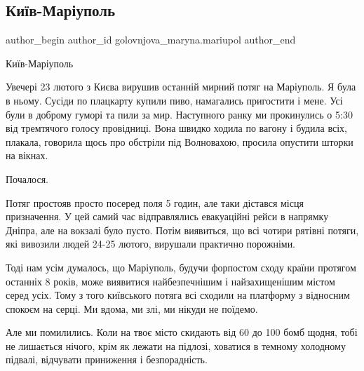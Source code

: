  
 
 
 
 

\subsection{Київ-Маріуполь}
\label{sec:08_04_2022.fb.golovnjova_maryna.mariupol.1.ki_v_mar_upol}

\ifcmt
 author_begin
   author_id golovnjova_maryna.mariupol
 author_end
\fi

Київ-Маріуполь

Увечері 23 лютого з Києва вирушив останній мирний потяг на Маріуполь. Я була в
ньому. Сусіди по плацкарту купили пиво, намагались пригостити і мене. Усі були
в доброму гуморі та пили за мир. Наступного ранку ми прокинулись о 5:30 від
тремтячого голосу провідниці. Вона швидко ходила по вагону і будила всіх,
плакала, говорила щось про обстріли під Волновахою, просила опустити шторки на
вікнах. 

Почалося.

Потяг простояв просто посеред поля 5 годин, але таки дістався місця
призначення. У цей самий час відправлялись евакуаційні рейси в напрямку Дніпра,
але на вокзалі було пусто. Потім виявиться, що всі чотири рятівні потяги, які
вивозили людей 24-25 лютого, вирушали практично порожніми. 

Тоді нам усім думалось, що Маріуполь, будучи форпостом сходу країни протягом
останніх 8 років, може виявитися найбезпечнішим і найзахищенішим містом серед
усіх. Тому з того київського потяга всі сходили на платформу з відносним
спокоєм на серці. Ми вдома, ми злі, ми нікуди не поїдемо. 

Але ми помилились. Коли на твоє місто скидають від 60 до 100 бомб щодня, тобі
не лишається нічого, крім як лежати на підлозі, ховатися в темному холодному
підвалі, відчувати приниження і безпорадність. 

